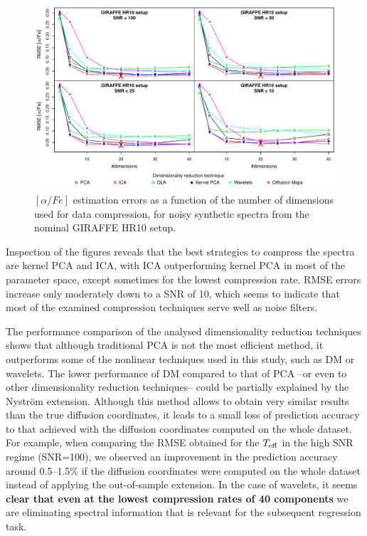 \documentclass[a4paper,fleqn,usenatbib]{mnras}
\begin{document}
{{{\begin{figure}
\centering\includegraphics[width=\textwidth]{flamesHR10_AlFe_BestSVM_N-RMSE_test.pdf}
\caption{$\left[ \alpha/Fe \right]$ estimation errors as a function of the number of
  dimensions used for data compression, for noisy synthetic
  spectra from the nominal GIRAFFE HR10 setup.}
\label{fig:07}
\end{figure}

Inspection of the figures reveals that the best strategies to compress
the spectra are kernel PCA and ICA, with ICA outperforming kernel PCA
in most of the parameter space, except sometimes for the lowest
compression rate. RMSE errors increase only moderately down to a SNR
of 10, which seems to indicate that most of the examined compression
techniques serve well as noise filters.

The performance comparison of the analysed dimensionality reduction
techniques shows that although traditional PCA is not the most
efficient method, it outperforms some of the nonlinear techniques used
in this study, such as DM or wavelets. %
The lower performance of DM compared to that of PCA --or even to other 
dimensionality reduction techniques-- could be partially explained by the 
Nystr\"{o}m extension. Although this method allows to obtain very similar 
results than the true diffusion coordinates, it leads to a small loss of 
prediction accuracy to that achieved with the diffusion coordinates computed 
on the whole dataset. For example, when comparing the RMSE obtained for the 
$T_{\rm eff}$ in the high SNR regime (SNR=100), we observed an improvement 
in the prediction accuracy around {0.5}--{1.5}\% if the diffusion 
coordinates were computed on the whole dataset instead of applying the 
out-of-sample extension.
In the case of wavelets, it seems {\bf clear that even at the lowest 
compression rates of 40 components} we are eliminating
spectral information that is relevant for the subsequent regression task. 

}}}
\end{document}
